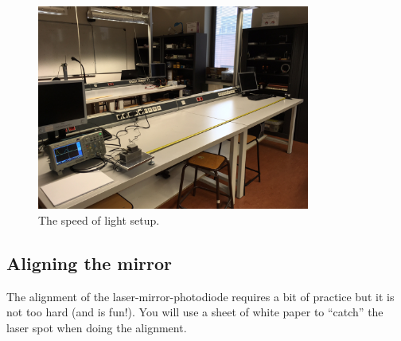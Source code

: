 \begin{figure}
	\centering
	\includegraphics[width=0.8\textwidth]{speed-of-light/apparatus-photo.png}
	\caption{The speed of light setup.}\label{sol:fig:apparatus-photo}
\end{figure}

\subsection{Aligning the mirror}

The alignment of the laser-mirror-photodiode requires a bit of practice but it is not too hard (and is fun!). You will use a sheet of white paper to “catch” the laser spot when doing the alignment.

